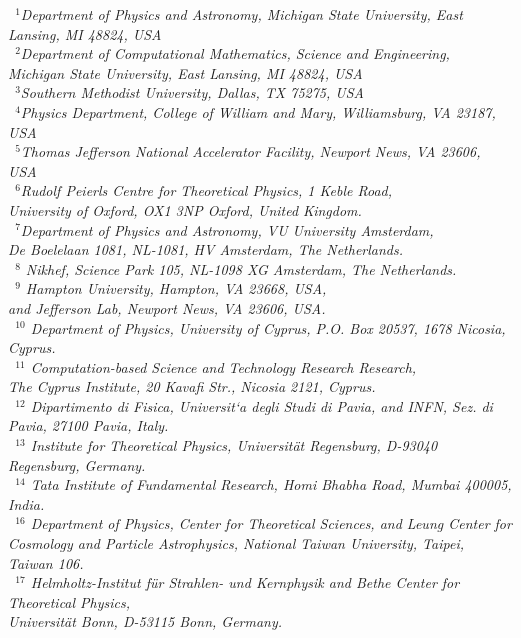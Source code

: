 \documentclass[twoside,12pt]{article}
\numberwithin{equation}{section}
\numberwithin{figure}{section}
\numberwithin{table}{section}
\begin{document}
\begin{center}
\vspace{.2cm}
{\it \footnotesize
~$^{1}$Department of Physics and Astronomy, Michigan State University, East Lansing, MI 48824, USA\\
~$^{2}$Department of Computational Mathematics, Science and Engineering, \\Michigan State University, East Lansing, MI 48824, USA\\
~$^{3}$Southern Methodist University, Dallas, TX 75275, USA\\
~$^{4}$Physics Department, College of William and Mary, Williamsburg, VA 23187, USA\\
~$^{5}$Thomas Jefferson National Accelerator Facility, Newport News, VA 23606, USA\\
~$^6$Rudolf Peierls Centre for Theoretical Physics, 1 Keble Road,\\ University of Oxford, OX1 3NP Oxford, United Kingdom.\\
~$^{7}$Department of Physics and Astronomy, VU University Amsterdam,\\
De Boelelaan 1081, NL-1081, HV Amsterdam, The Netherlands.\\
~$^{8}$ Nikhef, Science Park 105, NL-1098 XG Amsterdam, The Netherlands.\\
~$^{9}$ Hampton University, Hampton, VA 23668, USA,\\
and Jefferson Lab, Newport News, VA 23606, USA. \\
~$^{10}$ Department of Physics, University of Cyprus, P.O. Box 20537, 1678 Nicosia, Cyprus. \\
~$^{11}$ Computation-based Science and Technology Research Research,\\
The Cyprus Institute, 20
Kavafi Str., Nicosia 2121, Cyprus. \\
~$^{12}$ Dipartimento di Fisica, Universit`a degli Studi di Pavia, and INFN, Sez. di Pavia, 27100 Pavia, Italy. \\
~$^{13}$ Institute for Theoretical Physics, Universit\"at Regensburg, D-93040 Regensburg, Germany. \\
~$^{14}$ Tata Institute of Fundamental Research, Homi Bhabha Road, Mumbai 400005, India. \\
~$^{16}$ Department of Physics, Center for Theoretical Sciences,
and Leung Center for Cosmology and Particle Astrophysics,
National Taiwan University, Taipei, Taiwan 106. \\
~$^{17}$ Helmholtz-Institut f\"ur Strahlen- und Kernphysik and Bethe Center
for Theoretical Physics,\\ Universit\"at Bonn, D-53115 Bonn, Germany. \\
}
\end{center}
\end{document}
